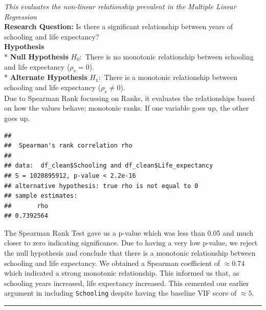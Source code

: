 \documentclass[
  10pt,
]{article}
\newenvironment{Shaded}{\begin{snugshade}}{\end{snugshade}}
\newcommand{\AttributeTok}[1]{\textcolor[rgb]{0.13,0.29,0.53}{#1}}
\newcommand{\FunctionTok}[1]{\textcolor[rgb]{0.13,0.29,0.53}{\textbf{#1}}}
\newcommand{\NormalTok}[1]{#1}
\newcommand{\OtherTok}[1]{\textcolor[rgb]{0.56,0.35,0.01}{#1}}
\newcommand{\SpecialCharTok}[1]{\textcolor[rgb]{0.81,0.36,0.00}{\textbf{#1}}}
\newcommand{\StringTok}[1]{\textcolor[rgb]{0.31,0.60,0.02}{#1}}
\begin{document}
\emph{This evaluates the non-linear relationship prevalent in the
Multiple Linear Regression}\\

\textbf{Research Question:} Is there a significant relationship between
years of schooling and life expectancy?\\

\textbf{Hypothesis}\\
* \textbf{Null Hypothesis} \(H_0:\) There is no monotonic relationship
between schooling and life expectancy (\(\rho_s = 0\)).\\
* \textbf{Alternate Hypothesis} \(H_1:\) There is a monotonic
relationship between schooling and life expectancy
(\(\rho_s \neq 0\)).\\

Due to Spearman Rank focussing on Ranks, it evaluates the relationships
based on how the values behave; monotonic ranks. If one variable goes
up, the other goes up.\\

\begin{Shaded}
\end{Shaded}

\begin{verbatim}
## 
##  Spearman's rank correlation rho
## 
## data:  df_clean$Schooling and df_clean$Life_expectancy
## S = 1020895912, p-value < 2.2e-16
## alternative hypothesis: true rho is not equal to 0
## sample estimates:
##       rho 
## 0.7392564
\end{verbatim}

The Spearman Rank Test gave us a p-value which was less than 0.05 and
much closer to zero indicating significance. Due to having a very low
p-value, we reject the null hypothesis and conclude that there is a
monotonic relationship between schooling and life expectancy. We
obtained a Spearman coefficient of \(\approx 0.74\) which indicated a
strong monotonic relationship. This informed us that, as schooling years
increased, life expectancy increased. This cemented our earlier argument
in including \texttt{Schooling} despite having the baseline VIF score of
\(\approx 5\).\\

\begin{center}\rule{0.5\linewidth}{0.5pt}\end{center}
\end{document}
